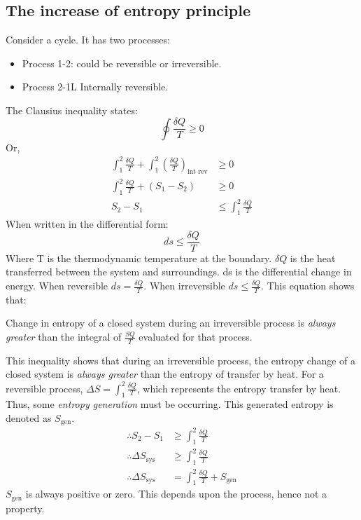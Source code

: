 \documentclass[class=report, crop=false, 12pt,a4paper]{standalone}
\numberwithin{equation}{section}
\begin{document}
\subsection{The increase of entropy principle}
Consider a cycle. It has two processes:
\begin{itemize}[noitemsep]
  \item Process 1-2: could be reversible or irreversible.
  \item Process 2-1L Internally reversible.
\end{itemize}
The Clausius inequality states:
\begin{equation} 
  \oint \frac{\delta Q}{T} \geq 0 
\end{equation}
Or,
\begin{align}
  \int_1^2 \frac{\delta Q}{T} + \int_1^2\left( \frac{\delta Q}{T} \right)_{\textrm{int rev}} &\geq 0 \\
  \int_1^2 \frac{\delta Q}{T} + (S_1 - S_2) &\geq 0 \\
  S_2 - S_1 &\leq \int_1^2 \frac{\delta Q}{T}
\end{align}
When written in the differential form:
\begin{equation} 
  ds \leq \frac{\delta Q}{T} 
\end{equation}
Where T is the thermodynamic temperature at the boundary. \( \delta Q \) is the heat transferred between the system and surroundings. ds is the differential change in energy. When reversible \( ds = \frac{\delta Q}{T} \). When irreversible \( ds \leq \frac{\delta Q}{T} \). This equation shows that:
\begin{center}
  Change in entropy of a closed system during an irreversible process is \emph{always greater} than the integral of \(\frac{SQ}{T}\) evaluated for that process.
\end{center}
This inequality shows that during an irreversible process, the entropy  change of a closed system is \emph{always greater} than the entropy of transfer by heat. For a reversible process, \( \Delta S = \int_1^2 \frac{\delta Q}{T} \), which represents the entropy transfer by heat. Thus, some \emph{entropy generation} must be occurring. This generated entropy is denoted as \(S_{\textrm{gen}}\).
\begin{align}
  \therefore S_2 - S_1 &\geq \int_1^2 \frac{\delta Q}{T} \\
  \therefore \Delta S_{\textrm{sys}} &\geq \int_1^2 \frac{\delta Q}{T} \\ 
  \therefore \Delta S_{\textrm{sys}} &= \int_1^2 \frac{\delta Q}{T} + S_{\textrm{gen}}
\end{align}
\( S_{\textrm{gen}} \) is always positive or zero. This depends upon the process, hence not a property.
\end{document}
